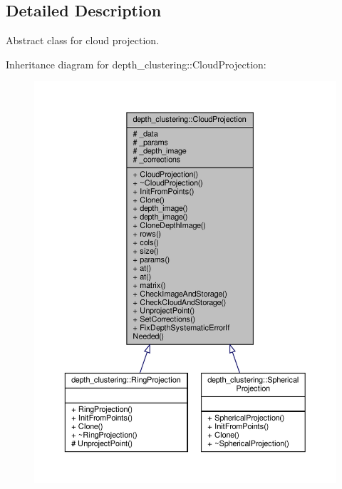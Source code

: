 \subsection{Detailed Description}
Abstract class for cloud projection. 

Inheritance diagram for depth\+\_\+clustering\+:\+:Cloud\+Projection\+:\nopagebreak
\begin{figure}[H]
\begin{center}
\leavevmode
\includegraphics[width=350pt]{classdepth__clustering_1_1CloudProjection__inherit__graph}
\end{center}
\end{figure}


